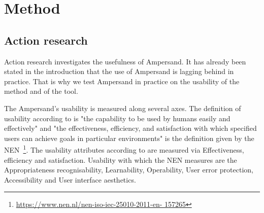 \newpage
\section{Method} \label{Method}

\subsection{Action research} \label{action_research}

\begin{comment}
Onderzoeksvraag:
Hoe bruikbaar is Ampersand voor het ontwerpen van register-systemen door middel van het analyseren van wet- en regelgeving in de volksgezondheid en in het bijzonder de Wet-BIG
\end{comment}
Action research investigates the usefulness of Ampersand.
It has already been stated in the introduction that the use of Ampersand is lagging behind in practice.
That is why we test Ampersand in practice on the usability of the method and of the tool.

The Ampersand's usability is measured along several axes.
The definition of usability according to \cite{shackel_usability_2009} is "the capability to be used by humans easily and effectively" and "the effectiveness,
efficiency, and satisfaction with which specified users can achieve goals in particular environments" is the definition given by the NEN~\footnote{\url{https://www.nen.nl/nen-iso-iec-25010-2011-en- 157265}}.
The usability attributes according to \cite{HORNBAEK200679} are measured via Effectiveness, efficiency and satisfaction.
Usability with which the NEN measures are the Appropriateness recognisability, Learnability, Operability, User error protection, Accessibility and User interface aesthetics.
\begin{comment}
Herkenbaarheid van geschiktheid (Appropriateness recognisability)
    De mate waarin gebruikers kunnen herkennen of een product of systeem geschikt is voor hun behoeften.
Leerbaarheid (Learnability)
    De mate waarin een product of systeem gebruikt kan worden door gespecificeerde gebruikers om gespecificeerde leerdoelen te bereiken met betrekking tot het gebruik van het product of systeem met effectiviteit, efficiëntie, vrijheid van risico en voldoening, in een gespecificeerde gebruikscontext.
Bedienbaarheid (Operability)
    De mate waarin een product of systeem attributen heeft die het makkelijk maken om het te bedienen en beheersen.
Voorkomen gebruikersfouten (User error protection)
    De mate waarin het systeem gebruikers beschermt tegen het maken van fouten.
Volmaaktheid gebruikersinteractie (User interface aesthetics)
    De mate waarin een gebruikersinterface het de gebruiker mogelijk maakt om een plezierige en voldoening gevende interactie te hebben.
Toegankelijkheid (Accessibility)
    De mate waarin een product of systeem gebruikt kan worden door mensen met de meest uiteenlopende eigenschappen en mogelijkheden om een gespecificeerd doel te bereiken in een gespecificeerde gebruikscontext.
\end{comment}

